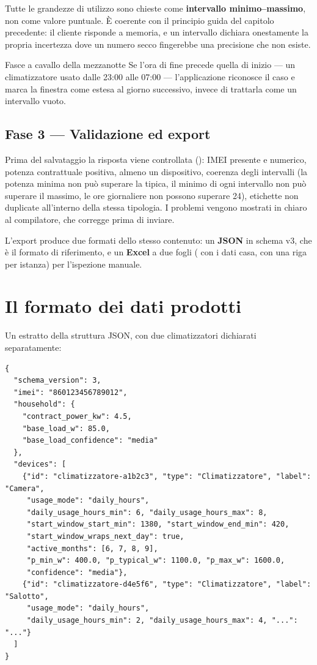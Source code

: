 Tutte le grandezze di utilizzo sono chieste come \textbf{intervallo minimo--massimo}, non come
valore puntuale. È coerente con il principio guida del capitolo precedente: il cliente risponde a
memoria, e un intervallo dichiara onestamente la propria incertezza dove un numero secco fingerebbe
una precisione che non esiste.

\begin{notebox}{Fasce a cavallo della mezzanotte}
Se l'ora di fine precede quella di inizio --- un climatizzatore usato dalle 23:00 alle 07:00 ---
l'applicazione riconosce il caso e marca la finestra come estesa al giorno successivo, invece di
trattarla come un intervallo vuoto.
\end{notebox}

\subsection*{Fase 3 --- Validazione ed export}

Prima del salvataggio la risposta viene controllata (): IMEI
presente e numerico, potenza contrattuale positiva, almeno un dispositivo, coerenza degli
intervalli (la potenza minima non può superare la tipica, il minimo di ogni intervallo non può
superare il massimo, le ore giornaliere non possono superare 24), etichette non duplicate
all'interno della stessa tipologia. I problemi vengono mostrati in chiaro al compilatore, che
corregge prima di inviare.

L'export produce due formati dello stesso contenuto: un \textbf{JSON} in schema v3, che è il
formato di riferimento, e un \textbf{Excel} a due fogli ( con i dati casa,
 con una riga per istanza) per l'ispezione manuale.

\section{Il formato dei dati prodotti}

Un estratto della struttura JSON, con due climatizzatori dichiarati separatamente:

{\small
\begin{verbatim}
{
  "schema_version": 3,
  "imei": "860123456789012",
  "household": {
    "contract_power_kw": 4.5,
    "base_load_w": 85.0,
    "base_load_confidence": "media"
  },
  "devices": [
    {"id": "climatizzatore-a1b2c3", "type": "Climatizzatore", "label": "Camera",
     "usage_mode": "daily_hours",
     "daily_usage_hours_min": 6, "daily_usage_hours_max": 8,
     "start_window_start_min": 1380, "start_window_end_min": 420,
     "start_window_wraps_next_day": true,
     "active_months": [6, 7, 8, 9],
     "p_min_w": 400.0, "p_typical_w": 1100.0, "p_max_w": 1600.0,
     "confidence": "media"},
    {"id": "climatizzatore-d4e5f6", "type": "Climatizzatore", "label": "Salotto",
     "usage_mode": "daily_hours",
     "daily_usage_hours_min": 2, "daily_usage_hours_max": 4, "...": "..."}
  ]
}
\end{verbatim}
}

